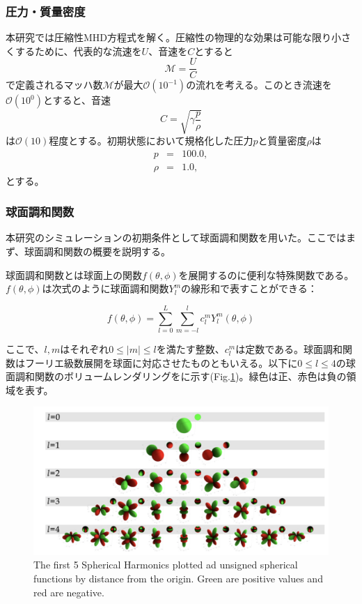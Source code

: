 \documentclass[12pt]{jsarticle}
\begin{document}
\subsubsection{圧力・質量密度}
本研究では圧縮性MHD方程式を解く。圧縮性の物理的な効果は可能な限り小さくするために、代表的な流速を$U$、音速を$C$とすると
\begin{equation}
\mathcal{M} = \frac{U}{C}
\end{equation}
で定義されるマッハ数$\mathcal{M}$が最大$\mathcal{O}(10^{-1})$の流れを考える。このとき流速を$\mathcal{O}(10^0)$とすると、音速
\begin{equation}
C = \sqrt{\gamma\frac{p}{\rho}}
\end{equation}
は$\mathcal{O}(10)$程度とする。初期状態において規格化した圧力$p$と質量密度$\rho$は
\begin{eqnarray}
p &=& 100.0, \\
\rho &=& 1.0, 
\end{eqnarray}
とする。

\subsubsection{球面調和関数}
本研究のシミュレーションの初期条件として球面調和関数を用いた。ここではまず、球面調和関数の概要を説明する。

球面調和関数とは球面上の関数$f(\theta,\phi)$を展開するのに便利な特殊関数である。$f(\theta,\phi)$は次式のように球面調和関数$Y_l^m$の線形和で表すことができる：

\begin{equation}
f(\theta,\phi) = \sum_{l=0}^L \sum_{m=-l}^l c_l^m Y_l^m (\theta,\phi)
\end{equation}

ここで、$l,m$はそれぞれ$0\leq |m| \leq l$を満たす整数、$c_l^m$は定数である。球面調和関数はフーリエ級数展開を球面に対応させたものともいえる。以下に$0 \leq l \leq 4$の球面調和関数のボリュームレンダリングをに示す(Fig.\ref{spherical})。緑色は正、赤色は負の領域を表す。
\begin{figure}[H]
\centering
\includegraphics[height=1.0\textheight,width=1.0\hsize,angle=0,keepaspectratio]{./Image/spherical2.png}
\caption{The first 5 Spherical Harmonics plotted ad unsigned spherical functions by distance from the origin. Green are positive values and red are negative.\cite{green2003spherical} } \label{spherical}
\end{figure}
\end{document}
